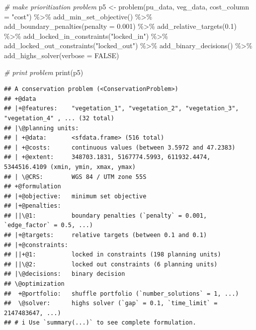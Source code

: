\documentclass[
  12pt,
]{book}
\newenvironment{Shaded}{\begin{snugshade}}{\end{snugshade}}
\newcommand{\AttributeTok}[1]{\textcolor[rgb]{0.77,0.63,0.00}{#1}}
\newcommand{\CommentTok}[1]{\textcolor[rgb]{0.56,0.35,0.01}{\textit{#1}}}
\newcommand{\ConstantTok}[1]{\textcolor[rgb]{0.00,0.00,0.00}{#1}}
\newcommand{\FloatTok}[1]{\textcolor[rgb]{0.00,0.00,0.81}{#1}}
\newcommand{\FunctionTok}[1]{\textcolor[rgb]{0.00,0.00,0.00}{#1}}
\newcommand{\NormalTok}[1]{#1}
\newcommand{\OtherTok}[1]{\textcolor[rgb]{0.56,0.35,0.01}{#1}}
\newcommand{\SpecialCharTok}[1]{\textcolor[rgb]{0.00,0.00,0.00}{#1}}
\newcommand{\StringTok}[1]{\textcolor[rgb]{0.31,0.60,0.02}{#1}}
\begin{document}
\begin{Shaded}
\begin{Highlighting}[]
\CommentTok{\# make prioritization problem}
\NormalTok{p5 }\OtherTok{\textless{}{-}} \FunctionTok{problem}\NormalTok{(pu\_data, veg\_data, }\AttributeTok{cost\_column =} \StringTok{"cost"}\NormalTok{) }\SpecialCharTok{\%\textgreater{}\%}
      \FunctionTok{add\_min\_set\_objective}\NormalTok{() }\SpecialCharTok{\%\textgreater{}\%}
      \FunctionTok{add\_boundary\_penalties}\NormalTok{(}\AttributeTok{penalty =} \FloatTok{0.001}\NormalTok{) }\SpecialCharTok{\%\textgreater{}\%}
      \FunctionTok{add\_relative\_targets}\NormalTok{(}\FloatTok{0.1}\NormalTok{) }\SpecialCharTok{\%\textgreater{}\%}
      \FunctionTok{add\_locked\_in\_constraints}\NormalTok{(}\StringTok{"locked\_in"}\NormalTok{) }\SpecialCharTok{\%\textgreater{}\%}
      \FunctionTok{add\_locked\_out\_constraints}\NormalTok{(}\StringTok{"locked\_out"}\NormalTok{) }\SpecialCharTok{\%\textgreater{}\%}
      \FunctionTok{add\_binary\_decisions}\NormalTok{() }\SpecialCharTok{\%\textgreater{}\%}
      \FunctionTok{add\_highs\_solver}\NormalTok{(}\AttributeTok{verbose =} \ConstantTok{FALSE}\NormalTok{)}

\CommentTok{\# print problem}
\FunctionTok{print}\NormalTok{(p5)}
\end{Highlighting}
\end{Shaded}

\begin{verbatim}
## A conservation problem (<ConservationProblem>)
## +@data
## |+@features:    "vegetation_1", "vegetation_2", "vegetation_3", "vegetation_4" , ... (32 total)
## |\@planning units:
## | +@data:       <sfdata.frame> (516 total)
## | +@costs:      continuous values (between 3.5972 and 47.2383)
## | +@extent:     348703.1831, 5167774.5993, 611932.4474, 5344516.4109 (xmin, ymin, xmax, ymax)
## | \@CRS:        WGS 84 / UTM zone 55S
## +@formulation
## |+@objective:   minimum set objective
## |+@penalties:
## ||\@1:          boundary penalties (`penalty` = 0.001, `edge_factor` = 0.5, ...)
## |+@targets:     relative targets (between 0.1 and 0.1)
## |+@constraints:
## ||+@1:          locked in constraints (198 planning units)
## ||\@2:          locked out constraints (6 planning units)
## |\@decisions:   binary decision
## \@optimization
##  +@portfolio:   shuffle portfolio (`number_solutions` = 1, ...)
##  \@solver:      highs solver (`gap` = 0.1, `time_limit` = 2147483647, ...)
## # i Use `summary(...)` to see complete formulation.
\end{verbatim}
\end{document}
